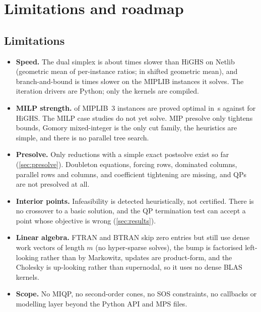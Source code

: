 \section{Limitations and roadmap}\label{sec:roadmap}

\subsection{Limitations}
\begin{itemize}
  \item \textbf{Speed.} The dual simplex is about \gmrSpx{} times slower than HiGHS on Netlib
        (geometric mean of per-instance ratios; \ratioSpx{} in shifted geometric mean), and
        branch-and-bound is \ratioMip{} times slower on the MIPLIB instances it solves. The iteration
        drivers are Python; only the kernels are compiled.
  \item \textbf{MILP strength.} \nMip{} of \nMipTot{} MIPLIB~3 instances are proved optimal in
        \tlMip\,s against \nMipRefOpt{} for HiGHS. The MILP case studies do not yet solve. MIP presolve
        only tightens bounds, Gomory mixed-integer is the only cut family, the heuristics are simple, and
        there is no parallel tree search.
  \item \textbf{Presolve.} Only reductions with a simple exact postsolve exist so far
        (\cref{sec:presolve}). Doubleton equations, forcing rows, dominated columns, parallel rows and
        columns, and coefficient tightening are missing, and QPs are not presolved at all.
  \item \textbf{Interior points.} Infeasibility is detected heuristically, not certified. There is no
        crossover to a basic solution, and the QP termination test can accept a point whose
        objective is wrong (\cref{sec:results}).
  \item \textbf{Linear algebra.} FTRAN and BTRAN skip zero entries but still use dense work vectors
        of length $m$ (no hyper-sparse solves), the bump is factorised left-looking rather than by
        Markowitz, updates are product-form, and
        the Cholesky is up-looking rather than supernodal, so it uses no dense BLAS kernels.
  \item \textbf{Scope.} No MIQP, no second-order cones, no SOS constraints, no callbacks or modelling
        layer beyond the Python API and MPS files.
\end{itemize}

